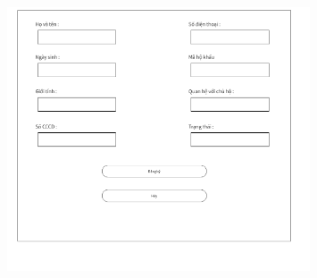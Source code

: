 \documentclass{article}
\begin{document}
\begin{itemize}
\begin{figure}[H]
        \includegraphics[width=0.8\textwidth]{Ảnh chương 4/Màn hình thêm thông tin dân cư.png}
    \end{figure}
    

\end{itemize}
\end{document}
